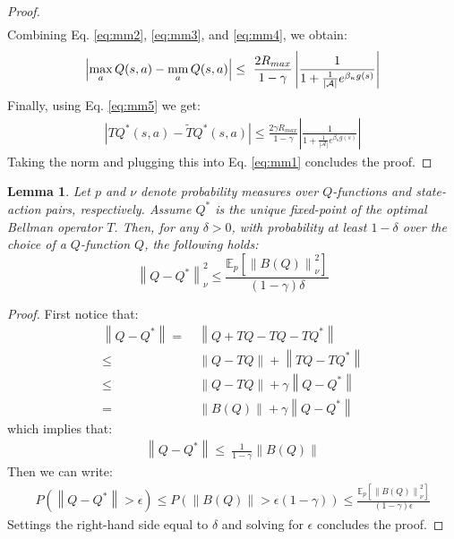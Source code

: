\documentclass{article}
\newtheorem{lemma}{Lemma}
\newcommand{\mm}{\operatornamewithlimits{mm}}
\newcommand{\wt}[1]{\widetilde{#1}}
\newcommand{\norm}[1]{\left\lVert #1 \right\rVert}
\newcommand{\abs}[1]{\left\lvert #1 \right\rvert}
\begin{document}
\begin{proof}
\begin{align}
\end{align}
Combining Eq. \eqref{eq:mm2}, \eqref{eq:mm3}, and \eqref{eq:mm4}, we obtain:
\begin{align*}
\abs{\max_a Q(s,a) - \mm_a Q(s,a)} \leq\ \frac{2 R_{max}}{1-\gamma}\abs{\frac{1}{1 + \frac{1}{\abs{\mathcal{A}}}e^{\beta_{\kappa} g(s)}}}
\end{align*}
Finally, using Eq. \eqref{eq:mm5} we get:
\begin{align*}
\abs{TQ^*(s,a) - \wt{T}Q^*(s,a)} \leq \frac{2\gamma R_{max}}{1-\gamma}\abs{\frac{1}{1 + \frac{1}{\abs{\mathcal{A}}}e^{\beta_{\kappa} g(s)}}}
\end{align*}
Taking the norm and plugging this into Eq. \eqref{eq:mm1} concludes the proof.
\end{proof}

\begin{lemma}
Let $p$ and $\nu$ denote probability measures over $Q$-functions and state-action pairs, respectively. Assume $Q^*$ is the unique fixed-point of the optimal Bellman operator $T$. Then, for any $\delta > 0$, with probability at least $1 - \delta$ over the choice of a $Q$-function $Q$, the following holds:
\begin{equation}
\norm{Q - Q^*}_{\nu}^2 \leq \frac{\mathbb{E}_p\left[ \norm{B(Q)}_{\nu}^2 \right]}{(1-\gamma)\delta}
\end{equation}
\end{lemma}
\begin{proof}
First notice that:
\begin{align*}
\norm{Q - Q^*} =\ & \norm{Q + TQ - TQ - TQ^*}\\ \leq\ & \norm{Q - TQ} + \norm{TQ - TQ^*}\\ \leq\ & \norm{Q - TQ} + \gamma\norm{Q - Q^*}\\ =\ & \norm{B(Q)} + \gamma\norm{Q - Q^*}
\end{align*}
which implies that:
\begin{align*}
\norm{Q - Q^*} \leq\ \frac{1}{1-\gamma}\norm{B(Q)}
\end{align*}
Then we can write:
\begin{align*}
P\left( \norm{Q - Q^*} > \epsilon \right) \leq P\left(\norm{B(Q)} > \epsilon (1-\gamma)\right) \leq \frac{\mathbb{E}_p\left[ \norm{B(Q)}_{\nu}^2 \right]}{(1-\gamma)\epsilon}
\end{align*}
Settings the right-hand side equal to $\delta$ and solving for $\epsilon$ concludes the proof.
\end{proof}
\end{document}
